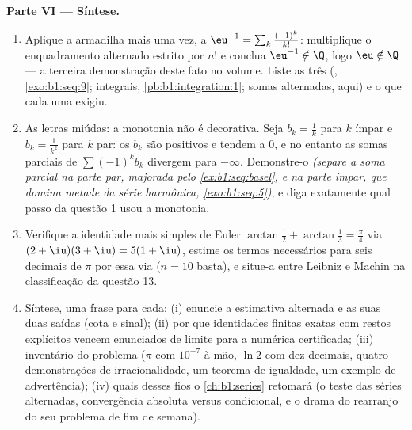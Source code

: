 \begin{problem}
\medskip
\noindent\textbf{Parte VI --- Síntese.}
\begin{enumerate}[resume]
  \item Aplique a armadilha mais uma vez, a $\eu^{-1} = \sum_k
        \frac{(-1)^k}{k!}$: multiplique o
        enquadramento alternado estrito por $n!$ e conclua $\eu^{-1} \notin \Q$,
        logo $\eu \notin \Q$ --- a terceira demonstração deste fato
        no volume. Liste as três (,
        \cref{exo:b1:seq:9}; integrais,
        \cref{pb:b1:integration:1}; somas alternadas, aqui) e
        o que cada uma exigiu.
  \item As letras miúdas: a monotonia não é decorativa. Seja
        $b_k = \frac1k$ para $k$ ímpar e $b_k = \frac{1}{k^2}$
        para $k$ par: os $b_k$ são positivos e tendem a $0$,
        e no entanto as somas parciais de $\sum (-1)^k b_k$ divergem para
        $-\infty$. Demonstre-o \emph{(separe a soma parcial na
        parte par, majorada pelo
        \cref{ex:b1:seq:basel}, e na parte ímpar, que
        domina metade da série harmônica,
        \cref{exo:b1:seq:5})}, e diga exatamente qual passo da
        questão 1 usou a monotonia.
  \item Verifique a identidade mais simples de Euler $\arctan\frac12 +
        \arctan\frac13 = \frac\pi4$ via
        $(2 + \iu)(3 + \iu) =
        5(1 + \iu)$, estime os termos necessários para seis decimais
        de $\pi$ por essa via ($n = 10$ basta), e situe-a
        entre Leibniz e Machin na classificação da questão
        13.
  \item Síntese, uma frase para cada: (i) enuncie a estimativa
        alternada e as suas duas saídas (cota e sinal); (ii) por que
        identidades finitas exatas com restos explícitos vencem
        enunciados de limite para a numérica certificada; (iii)
        inventário do problema ($\pi$ com $10^{-7}$ à mão, $\ln 2$
        com dez decimais, quatro demonstrações de irracionalidade,
        um teorema de igualdade, um exemplo de advertência); (iv)
        quais desses fios o \cref{ch:b1:series} retomará (o teste das séries
        alternadas, convergência absoluta versus condicional,
        e o drama do rearranjo do seu problema de fim de semana).
\end{enumerate}
\end{problem}
